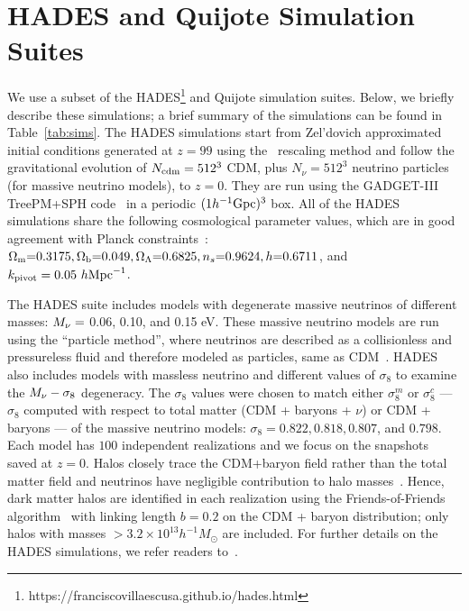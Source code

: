 \section{HADES and Quijote Simulation Suites} \label{sec:hades} 
We use a subset of the HADES\footnote{https://franciscovillaescusa.github.io/hades.html} 
and Quijote simulation suites. Below, we briefly describe these simulations; 
a brief summary of the simulations can be found in Table~\ref{tab:sims}. 
The HADES simulations start from Zel'dovich approximated initial conditions 
generated at $z=99$ using the~\cite{zennaro2017a} rescaling method and follow 
the gravitational evolution of $N_{\rm cdm}=512^3$ CDM, plus $N_{\nu}=512^3$ 
neutrino particles (for massive neutrino models), to $z=0$. They are run using 
the {\sc GADGET-III} TreePM+SPH code~\citep{springel2005} in a periodic 
$(1 h^{-1}{\rm Gpc})^3$ box. All of the HADES simulations share the following 
cosmological parameter values, which are in good agreement with Planck 
constraints~\cite{ade2016a}: $\Omega_{\rm m}{=}0.3175, \Omega_{\rm b}{=}0.049, \Omega_\Lambda{=}0.6825, n_s{=}0.9624, h{=}0.6711$, 
and $k_{\rm pivot} = 0.05~h{\rm Mpc}^{-1}$. 

The HADES suite includes models with degenerate massive neutrinos of different 
masses: $M_\nu = $ 0.06, 0.10, and 0.15 eV. These massive neutrino models are run 
using the ``particle method'', where neutrinos are described as a collisionless 
and pressureless fluid and therefore modeled as particles, same as 
CDM~\citep{brandbyge2008,viel2010}. HADES also includes models with massless 
neutrino and different values of $\sigma_8$ to examine the $M_\nu-\sigma_8$ 
degeneracy. The $\sigma_8$ values were chosen to match either $\sigma_8^m$ or 
$\sigma_8^{c}$ --- $\sigma_8$ computed with respect to total matter 
(CDM + baryons + $\nu$) or CDM + baryons --- of the massive neutrino models: 
$\sigma_8 = 0.822, 0.818, 0.807$, and $0.798$. Each model has $100$ independent 
realizations and we focus on the snapshots saved at $z = 0$. Halos closely 
trace the CDM+baryon field rather than the total matter field and neutrinos 
have negligible contribution to halo masses~\citep[\emph{e.g.}][]{ichiki2012, castorina2014, loverde2014, villaescusa-navarro2014}.
Hence, dark matter halos are identified in each realization using the Friends-of-Friends 
algorithm~\cite[FoF;][]{davis1985} with linking length $b=0.2$ on the CDM + baryon
distribution; only halos with masses $> 3.2\times 10^{13} h^{-1}M_\odot$ 
are included. For further details on the HADES simulations, we refer readers 
to~\cite{villaescusa-navarro2018}. 

